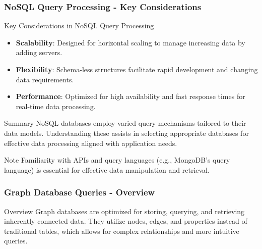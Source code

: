 \documentclass[aspectratio=169]{beamer}
\begin{document}
\begin{frame}[fragile]
    \frametitle{NoSQL Query Processing - Key Considerations}
    \begin{block}{Key Considerations in NoSQL Query Processing}
        \begin{itemize}
            \item \textbf{Scalability}: Designed for horizontal scaling to manage increasing data by adding servers.
            \item \textbf{Flexibility}: Schema-less structures facilitate rapid development and changing data requirements.
            \item \textbf{Performance}: Optimized for high availability and fast response times for real-time data processing.
        \end{itemize}
    \end{block}
    
    \begin{block}{Summary}
        NoSQL databases employ varied query mechanisms tailored to their data models. Understanding these assists in selecting appropriate databases for effective data processing aligned with application needs.
    \end{block}
    
    \begin{block}{Note}
        Familiarity with APIs and query languages (e.g., MongoDB's query language) is essential for effective data manipulation and retrieval.
    \end{block}
\end{frame}

\begin{frame}[fragile]
    \frametitle{Graph Database Queries - Overview}
    \begin{block}{Overview}
        Graph databases are optimized for storing, querying, and retrieving inherently connected data. 
        They utilize nodes, edges, and properties instead of traditional tables, which allows for complex relationships and more intuitive queries.
    \end{block}
\end{frame}
\end{document}
